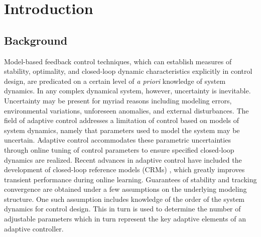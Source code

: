 \chapter{Introduction} \label{ch:introduction}
\section{Background}
Model-based feedback control techniques, which can establish measures of stability, optimality, and closed-loop dynamic characteristics explicitly in control design, are predicated on a certain level of \textit{a priori} knowledge of system dynamics. In any complex dynamical system, however, uncertainty is inevitable. Uncertainty may be present for myriad reasons including modeling errors, environmental variations, unforeseen anomalies, and external disturbances. The field of adaptive control addresses a limitation of control based on models of system dynamics, namely that parameters used to model the system may be uncertain. Adaptive control \cite{narendra2012stable, lavretsky2013robust} accommodates these parametric uncertainties through online tuning of control parameters to ensure specified closed-loop dynamics are realized. Recent advances in adaptive control have included the development of closed-loop reference models (CRMs) \cite{gibson2013adaptive}, which greatly improves transient performance during online learning. Guarantees of stability and tracking convergence are obtained under a few assumptions on the underlying modeling structure. One such assumption includes knowledge of the order of the system dynamics for control design. This in turn is used to determine the number of adjustable parameters which in turn represent the key adaptive elements of an adaptive controller.

